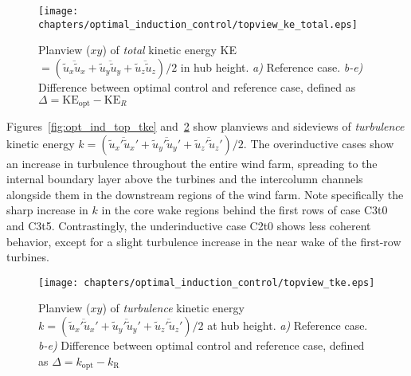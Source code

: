 		\begin{figure}[hbt]
			\centering
			\texttt{[image: chapters/optimal\_induction\_control/topview\_ke\_total.eps]}
			\caption[Planview ($xy$) of \emph{total} kinetic energy KE $= (\overline{\widetilde{u}_x \widetilde{u}_x} +
			\overline{\widetilde{u}_y \widetilde{u}_y} + \overline{\widetilde{u}_z \widetilde{u}_z})/2$ in hub height.]{Planview ($xy$) of \emph{total} kinetic energy KE $= (\overline{\widetilde{u}_x \widetilde{u}_x} +
			\overline{\widetilde{u}_y \widetilde{u}_y} + \overline{\widetilde{u}_z \widetilde{u}_z})/2$ in hub height. \emph{a) } Reference case. \emph{b-e)} Difference between optimal control and reference case, defined as $\Delta = \text{KE}_{\text{opt}} - \text{KE}_{R}$  \label{fig:opt_ind_top_total_ke}}
		\end{figure}
	
		Figures~\ref{fig:opt_ind_top_tke} and~\ref{fig:opt_ind_side_tke} show planviews and sideviews of \emph{turbulence} kinetic energy $k = (\overline{\widetilde{u}_x'\widetilde{u}_x'} + \overline{\widetilde{u}_y'\widetilde{u}_y'} + \overline{\widetilde{u}_z'\widetilde{u}_z'})/2$. The overinductive cases show an increase in turbulence throughout the entire wind farm, spreading to the internal boundary layer above the turbines and the intercolumn channels alongside them in the downstream regions of the wind farm. Note specifically the sharp increase in $k$ in the core wake regions behind the first rows of case C3t0 and C3t5. Contrastingly, the underinductive case C2t0 shows less coherent behavior, except for a slight turbulence increase in the near wake of the first-row turbines.
	
		\begin{figure}[ht]
			\centering
			\texttt{[image: chapters/optimal\_induction\_control/topview\_tke.eps]}
			\caption[Planview ($xy$) of \emph{turbulence} kinetic energy $k = (\overline{\widetilde{u}_x'\widetilde{u}_x'} + \overline{\widetilde{u}_y'\widetilde{u}_y'} + \overline{\widetilde{u}_z'\widetilde{u}_z'})/2$ at hub height.]{Planview ($xy$) of \emph{turbulence} kinetic energy $k = (\overline{\widetilde{u}_x'\widetilde{u}_x'} + \overline{\widetilde{u}_y'\widetilde{u}_y'} + \overline{\widetilde{u}_z'\widetilde{u}_z'})/2$ at hub height. \emph{a) } Reference case. \emph{b-e)} Difference between optimal control and reference case, defined as $\Delta = k_{\text{opt}} - k_{\text{R}}$  \label{fig:opt_ind_side_tke}}
		\end{figure}
	
